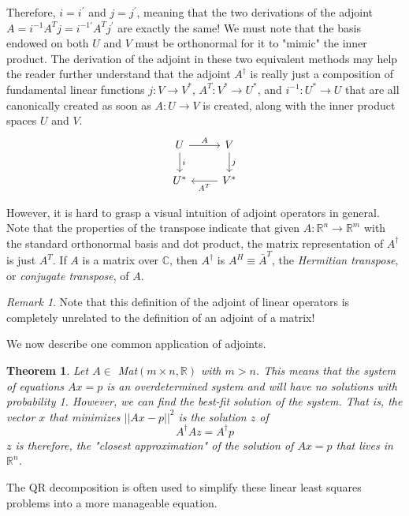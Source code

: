 \documentclass{article}
\newtheorem{theorem}{Theorem}[section]
\theoremstyle{remark}
\newtheorem*{remark}{Remark}
\theoremstyle{definition}
\begin{document}
Therefore, $i = i^\prime$ and $j = j^\prime$, meaning that the two derivations of the adjoint $A = i^{-1} A^T j = i^{-1 \prime} A^T j^\prime$ are exactly the same! We must note that the basis endowed on both $U$ and $V$ must be orthonormal for it to "mimic" the inner product. The derivation of the adjoint in these two equivalent methods may help the reader further understand that the adjoint $A^\dagger$ is really just a composition of fundamental linear functions $j: V \longrightarrow V^*$, $A^T: V^* \longrightarrow U^*$, and $i^{-1}: U^* \longrightarrow U$ that are all canonically created as soon as $A: U \longrightarrow V$ is created, along with the inner product spaces $U$ and $V$. 
\[
  \begin{tikzcd}
    U \arrow{r}{A} \arrow{d}{i} & V \arrow{d}{j}\\
    U^* & V^* \arrow{l}{A^T}
  \end{tikzcd}
\]

However, it is hard to grasp a visual intuition of adjoint operators in general. Note that the properties of the transpose indicate that given $A: \mathbb{R}^n \longrightarrow \mathbb{R}^m$ with the standard orthonormal basis and dot product, the matrix representation of $A^\dagger$ is just $A^T$. If $A$ is a matrix over $\mathbb{C}$, then $A^\dagger$ is $A^H \equiv \bar{A}^T$, the \textit{Hermitian transpose}, or \textit{conjugate transpose}, of $A$. 

\begin{remark}
Note that this definition of the adjoint of linear operators is completely unrelated to the definition of an adjoint of a matrix! 
\end{remark}

We now describe one common application of adjoints. 
\begin{theorem}
Let $A \in$ Mat$(m \times n, \mathbb{R})$ with $m > n$. This means that the system of equations $A x = p$ is an overdetermined system and will have no solutions with probability 1. However, we can find the \textit{best-fit solution} of the system. That is, the vector $x$ that minimizes $||A x -p||^2$ is the solution $z$ of 
\[ A^\dagger A z = A^\dagger p\]
$z$ is therefore, the "closest approximation" of the solution of $A x = p$ that lives in $\mathbb{R}^n$. 
\end{theorem}

The QR decomposition is often used to simplify these linear least squares problems into a more manageable equation. 
\end{document}
